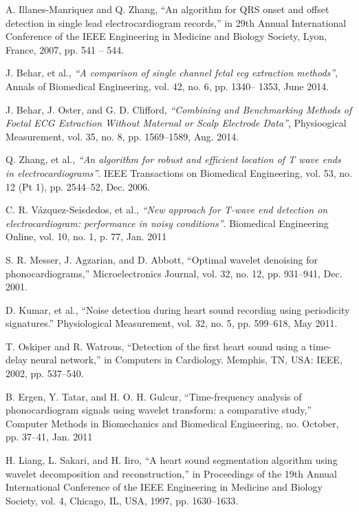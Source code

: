 \begin{thebibliography}{9}
  A. Illanes-Manriquez and Q. Zhang, “An algorithm for QRS onset and
  offset detection in single lead electrocardiogram records,” in 29th Annual International Conference of the IEEE
  Engineering in Medicine and Biology Society, Lyon, France, 2007, pp. 541 – 544.

  J. Behar, et al., \textit{“A comparison of single channel fetal ecg extraction methods”}, Annals of Biomedical
  Engineering, vol. 42, no. 6, pp. 1340–
  1353, June 2014.

  J. Behar, J. Oster, and G. D. Clifford, \textit{“Combining and Benchmarking
  Methods of Foetal ECG Extraction Without Maternal or Scalp Electrode Data”}, Physioogical Measurement, vol. 35, no.
  8, pp. 1569–1589, Aug.
  2014.

  Q. Zhang, et al., \textit{“An algorithm for robust and efficient location of T wave ends in electrocardiograms”}.
  IEEE Transactions on Biomedical Engineering, vol. 53, no. 12 (Pt 1), pp. 2544–52, Dec. 2006.

  C. R. Vázquez-Seisdedos, et al., \textit{“New approach for T-wave end
  detection on electrocardiogram: performance in noisy conditions”}.
  Biomedical Engineering Online, vol. 10, no. 1, p. 77, Jan. 2011

  S. R. Messer, J. Agzarian, and D. Abbott, “Optimal wavelet denoising
  for phonocardiograms,” Microelectronics Journal, vol. 32, no. 12, pp.
  931–941, Dec. 2001.

  D. Kumar, et al., “Noise detection during heart sound recording using
  periodicity signatures.” Physiological Measurement, vol. 32, no. 5, pp. 599–618, May 2011.

  T. Oskiper and R. Watrous, “Detection of the first heart sound using a time-delay neural network,” in Computers in
  Cardiology. Memphis,
  TN, USA: IEEE, 2002, pp. 537–540.

  B. Ergen, Y. Tatar, and H. O. H. Gulcur, “Time-frequency analysis of
  phonocardiogram signals using wavelet transform: a comparative study,” Computer Methods in Biomechanics and
  Biomedical Engineering, no. October, pp. 37–41, Jan. 2011

  H. Liang, L. Sakari, and H. Iiro, “A heart sound segmentation algorithm using wavelet decomposition and
  reconstruction,” in Proceedings of the 19th Annual International Conference of the IEEE Engineering in Medicine and
  Biology Society, vol. 4, Chicago, IL, USA, 1997, pp. 1630–1633.


\end{thebibliography}
